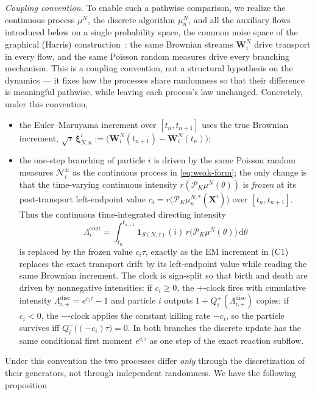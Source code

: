 \documentclass[a4paper,fleqn]{cas-sc}
\theoremstyle{definition}
\theoremstyle{remark}
\begin{document}
\emph{Coupling convention.} To enable such a pathwise comparison, we realize the
continuous process $\mu^N$, the discrete algorithm $\mu^N_n$, and all the
auxiliary flows introduced below on a single probability space, the common noise
space of the graphical (Harris) construction~\cite{harris1972nearest,harris1978additive}: the same Brownian streams $\mathbf W^N_i$ drive
transport in every flow, and the same Poisson random measures drive every
branching mechanism. This is a coupling convention, not a structural hypothesis
on the dynamics --- it fixes how the processes share randomness so that their
difference is meaningful pathwise, while leaving each process's law unchanged.
Concretely, under this convention,
\begin{itemize}
\item[(C1)] the Euler--Maruyama increment over $[t_n,t_{n+1}]$ uses the true
Brownian increment, $\sqrt{\tau}\,\boldsymbol\xi^i_{N,n}
:=\big(\mathbf W^N_i(t_{n+1})-\mathbf W^N_i(t_n)\big)$;
\item[(C2)] the one-step branching of particle $i$ is driven by the same Poisson random
measures $\mathcal N^\pm_i$ as the continuous process in \eqref{eq:weak-form};
the only change is that the time-varying continuous intensity
$r(\mathcal P_K\mu^N(\theta))$ is \emph{frozen} at its post-transport
left-endpoint value $c_i= r\!\big(\mathcal P_K\mu^{N,*}_n(\mathbf X^i)\big)$
over $[t_n,t_{n+1}]$. Thus the continuous time-integrated directing intensity
\[
\Lambda^{\mathrm{cont}}_i=\int_{t_n}^{t_{n+1}}
\mathbf 1_{S(N,\tau)}(i)\,r\!\big(\mathcal P_K\mu^N(\theta)\big)\,\mathrm d\theta
\]
is replaced by the frozen value $c_i\tau$, exactly as the EM increment in (C1)
replaces the exact transport drift by its left-endpoint value while reading the
same Brownian increment. The clock is sign-split so that birth and death are
driven by nonnegative intensities: if $c_i\ge0$, the $+$-clock fires with
cumulative intensity $\Lambda^{\mathrm{disc}}_{i,+}=e^{c_i\tau}-1$ and particle
$i$ outputs $1+Q^+_i(\Lambda^{\mathrm{disc}}_{i,+})$ copies; if $c_i<0$, the
$-$-clock applies the constant killing rate $-c_i$, so the particle survives iff
$Q^-_i\big((-c_i)\tau\big)=0$. In both branches the discrete update has the same
conditional first moment $e^{c_i\tau}$ as one step of the exact reaction subflow.
\end{itemize}
Under this convention the two processes differ \emph{only} through the
discretization of their generators, not through independent randomness. We have the following proposition
\end{document}
